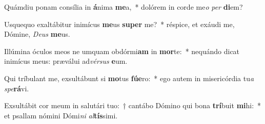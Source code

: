 \item Quámdiu ponam consília in \textbf{á}nima \textbf{me}a,~* dolórem in corde me\textit{o} \textit{per} \textbf{di}em?
\item Usquequo exaltábitur inimícus \textbf{me}us \textbf{su}\textbf{per} me?~* réspice, et exáudi me, Dómine, \textit{De}\textit{us} \textbf{me}us.
\item Illúmina óculos meos ne umquam obdórmi\textbf{am} in \textbf{mor}te:~* nequándo dicat inimícus meus: præválui ad\textit{vér}\textit{sus} \textbf{e}um.
\item Qui tríbulant me, exsultábunt si \textbf{mo}tus \textbf{fú}\textbf{e}ro:~* ego autem in misericórdia tu\textit{a} \textit{spe}\textbf{rá}vi.
\item Exsultábit cor meum in salutári tuo:~† cantábo Dómino qui bona \textbf{trí}buit \textbf{mi}hi:~* et psallam nómini Dómi\textit{ni} \textit{al}\textbf{tís}simi.
